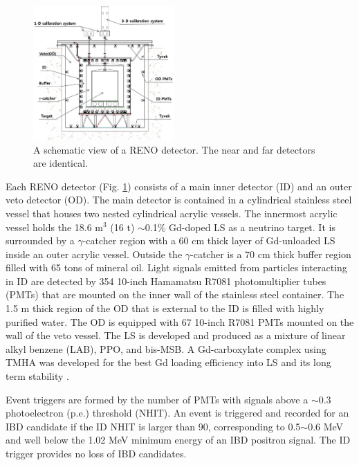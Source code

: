 \documentclass[aps,prl,twocolumn,superscriptaddress,showpacs]{revtex4-1}
\begin{document}
\begin{figure}[hbt]
\begin{center}
\includegraphics[width=0.48\textwidth]{RENO_detector.eps}
\caption{A schematic view of a RENO detector. The near and far detectors are identical.}
\label{fig:RENO-detector}
\end{center}
\end{figure}
Each RENO detector (Fig. \ref{fig:RENO-detector}) consists of a main inner detector (ID) and an outer veto detector (OD). The main detector is contained in a cylindrical stainless steel vessel that houses two nested cylindrical acrylic vessels\cite{ref_18}. The innermost acrylic vessel holds the 18.6 m$^3$ (16 t) $\sim$0.1\% Gd-doped LS as a neutrino target. It is surrounded by a $\gamma$-catcher region with a 60 cm thick layer of Gd-unloaded LS inside an outer acrylic vessel. Outside the $\gamma$-catcher is a 70 cm thick buffer region filled with 65 tons of mineral oil. Light signals emitted from particles interacting in ID are detected by 354 10-inch Hamamatsu R7081 photomultiplier tubes (PMTs) that are mounted on the inner wall of the stainless steel container. The 1.5 m thick region of the OD that is external to the ID is filled with highly purified water. The OD is equipped with 67 10-inch R7081 PMTs mounted on the wall of the veto vessel.
The LS is developed and produced as a mixture of linear alkyl benzene (LAB), PPO, and bis-MSB. A Gd-carboxylate complex using TMHA was developed for the best Gd loading efficiency into LS and its long term stability \cite{ref_19}. 

Event triggers are formed by the number of PMTs with signals above a $\sim$0.3 photoelectron (p.e.) threshold (NHIT). An event is triggered and recorded for an IBD candidate if the ID NHIT is larger than 90, corresponding to 0.5$\sim$0.6 MeV and well below the 1.02 MeV minimum energy of an IBD positron signal. 
The ID trigger provides no loss of IBD candidates. 
\end{document}
